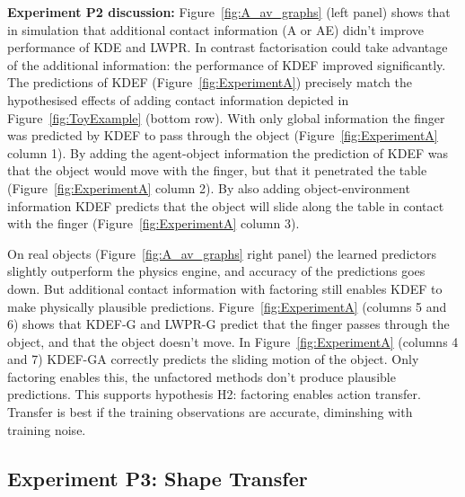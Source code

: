 {\bf Experiment P2 discussion:} Figure~\ref{fig:A_av_graphs} (left panel) shows that in simulation that additional contact information (A or AE) didn't improve performance of KDE and LWPR. In contrast factorisation could take advantage of the additional information: the performance of KDEF improved significantly. The predictions of KDEF (Figure~\ref{fig:ExperimentA}) precisely match the hypothesised
effects of adding contact information depicted in Figure~\ref{fig:ToyExample} (bottom row). With only global information the finger was predicted by KDEF to pass through the object (Figure~\ref{fig:ExperimentA} column 1). By adding the agent-object information the prediction of KDEF was that the object would move with the finger, but that it penetrated the table (Figure~\ref{fig:ExperimentA} column 2). By also adding object-environment information KDEF predicts that the object will slide along the table in contact with the finger (Figure~\ref{fig:ExperimentA} column 3).

On real objects (Figure~\ref{fig:A_av_graphs} right panel) the learned predictors slightly outperform the physics engine, and accuracy of the predictions goes down. But additional contact information with factoring still enables KDEF to make physically plausible predictions. Figure~\ref{fig:ExperimentA} (columns 5 and 6) shows that KDEF-G and LWPR-G predict that the finger passes through the object, and that the object doesn't move. In Figure~\ref{fig:ExperimentA} (columns 4 and 7) KDEF-GA correctly predicts the sliding motion of the object. Only factoring enables this, the unfactored methods don't produce plausible predictions. This supports hypothesis H2: factoring enables action transfer. Transfer is best if the training observations are accurate, diminshing with training noise. 

\subsection{Experiment P3:  Shape Transfer}\label{sec:Results.Shape}

